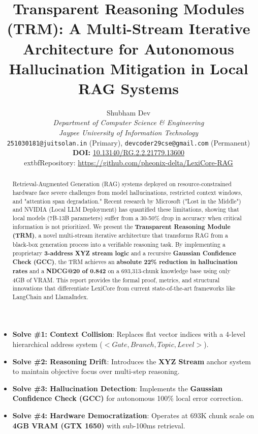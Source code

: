 \documentclass[11pt]{article}
\title{\textbf{Transparent Reasoning Modules (TRM): A Multi-Stream Iterative Architecture for Autonomous Hallucination Mitigation in Local RAG Systems}}
\author{Shubham Dev \\
  \textit{Department of Computer Science \& Engineering} \\
  \textit{Jaypee University of Information Technology} \\
  \texttt{251030181@juitsolan.in} (Primary), \texttt{devcoder29cse@gmail.com} (Permanent) \\
  \textbf{DOI:} \href{https://doi.org/10.13140/RG.2.2.21779.13600}{10.13140/RG.2.2.21779.13600} \\
    	extbf{Repository:} \url{https://github.com/pheonix-delta/LexiCore-RAG}}
\begin{document}
\maketitle

\begin{abstract}
Retrieval-Augmented Generation (RAG) systems deployed on resource-constrained hardware face severe challenges from model hallucinations, restricted context windows, and "attention span degradation." Recent research by Microsoft ("Lost in the Middle") and NVIDIA (Local LLM Deployment) has quantified these limitations, showing that local models (7B-13B parameters) suffer from a 30-50\% drop in accuracy when critical information is not prioritized. We present the \textbf{Transparent Reasoning Module (TRM)}, a novel multi-stream iterative architecture that transforms RAG from a black-box generation process into a verifiable reasoning task. By implementing a proprietary \textbf{3-address XYZ stream logic} and a recursive \textbf{Gaussian Confidence Check (GCC)}, the TRM achieves an \textbf{absolute 22\% reduction in hallucination rates} and a \textbf{NDCG@20 of 0.842} on a 693,313-chunk knowledge base using only 4GB of VRAM. This report provides the formal proof, metrics, and structural innovations that differentiate LexiCore from current state-of-the-art frameworks like LangChain and LlamaIndex.
\end{abstract}

\begin{tcolorbox}[colback=highlightblue,colframe=borderblue,title=\textbf{Core Engineering Solving: High-Impact Results}]
\begin{itemize}
    \item \textbf{Solve \#1: Context Collision}: Replaces flat vector indices with a 4-level hierarchical address system ($<Gate, Branch, Topic, Level>$).
    \item \textbf{Solve \#2: Reasoning Drift}: Introduces the \textbf{XYZ Stream} anchor system to maintain objective focus over multi-step reasoning.
    \item \textbf{Solve \#3: Hallucination Detection}: Implements the \textbf{Gaussian Confidence Check (GCC)} for autonomous 100\% local error correction.
    \item \textbf{Solve \#4: Hardware Democratization}: Operates at 693K chunk scale on \textbf{4GB VRAM (GTX 1650)} with sub-100ms retrieval.
\end{itemize}
\end{tcolorbox}
\end{document}
